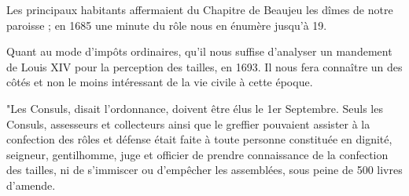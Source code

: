 Les principaux habitants affermaient du Chapitre de Beaujeu les dîmes de notre paroisse ; en 1685 une minute du rôle nous en énumère jusqu'à 19.

Quant au mode d'impôts ordinaires, qu'il nous suffise d'analyser un mandement de Louis XIV pour la perception des tailles, en 1693. Il nous fera connaître un des côtés et non le moins intéressant de la vie civile à cette époque.

"Les Consuls, disait l'ordonnance, doivent être élus le 1er Septembre. Seuls les Consuls, assesseurs et collecteurs ainsi que le greffier pouvaient assister à la confection des rôles et défense était faite à toute personne constituée en dignité, seigneur, gentilhomme, juge et officier de prendre connaissance de la confection des tailles, ni de s'immiscer ou d'empêcher les assemblées, sous peine de 500 livres d'amende.

